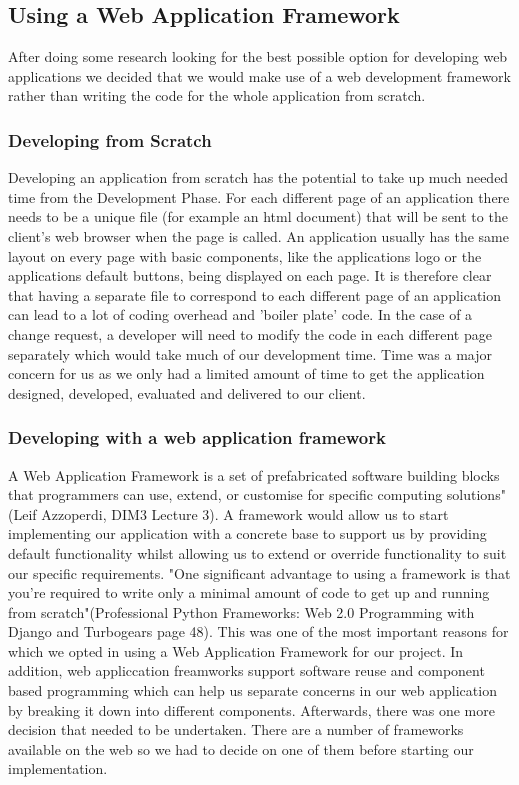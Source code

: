\documentclass{l3proj}
\begin{document}
\subsection {Using a Web Application Framework}
After doing some research looking for the best possible option for developing web 
applications we decided that we would make use of a web development framework 
rather than writing the code for the whole application from scratch.
\subsubsection{ Developing from Scratch}
Developing an application from scratch has the potential to take up much needed time 
from the Development Phase. For each different page of an application there needs to be 
a unique file (for example an html document) that will be sent to the client's web browser 
when the page is called. An application usually has the same layout on every page with 
basic components, like the applications logo or the applications default buttons, being 
displayed on each page. It is therefore clear that having a separate file to correspond to 
each different page of an application can lead to a lot of coding overhead and 'boiler 
plate' code. In the case of a change request, a developer will need to modify the code in 
each different page separately which would take much of our development time. Time was a major concern for us as we only had a limited amount of time to get the application designed, developed, evaluated and delivered to our client. \subsubsection{Developing with a web application framework}
A Web Application Framework is a set of prefabricated software building blocks that 
programmers can use, extend, or customise for specific computing solutions" (Leif 
Azzoperdi, DIM3 Lecture 3). A framework would allow us to start implementing our 
application with a concrete base to support us by providing default functionality whilst 
allowing us to extend or override functionality to suit our specific requirements. "One 
significant advantage to using a framework is that you're required to write only a 
minimal amount of code to get up and running from scratch"(Professional Python 
Frameworks: Web 2.0 Programming with Django and Turbogears page 48). This was 
one of the most important reasons for which we opted in using a Web Application 
Framework for our project. In addition, web appliccation freamworks support software reuse and component based programming which can help us separate concerns in our web application by breaking it down into different components. Afterwards, there was one more decision that needed to be 
undertaken. There are a number of frameworks available on the web so we had to decide 
on one of them before starting our implementation. 
\end{document}
